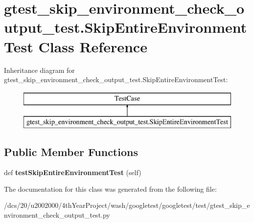 \hypertarget{classgtest__skip__environment__check__output__test_1_1SkipEntireEnvironmentTest}{}\section{gtest\+\_\+skip\+\_\+environment\+\_\+check\+\_\+output\+\_\+test.\+Skip\+Entire\+Environment\+Test Class Reference}
\label{classgtest__skip__environment__check__output__test_1_1SkipEntireEnvironmentTest}
Inheritance diagram for gtest\+\_\+skip\+\_\+environment\+\_\+check\+\_\+output\+\_\+test.\+Skip\+Entire\+Environment\+Test\+:\begin{figure}[H]
\begin{center}
\leavevmode
\includegraphics[height=2.000000cm]{classgtest__skip__environment__check__output__test_1_1SkipEntireEnvironmentTest}
\end{center}
\end{figure}
\subsection*{Public Member Functions}
\begin{DoxyCompactItemize}
\item 
\mbox{\label{classgtest__skip__environment__check__output__test_1_1SkipEntireEnvironmentTest_a9268ce42dc9a4382dc7da903b79061ce}} 
def {\bfseries test\+Skip\+Entire\+Environment\+Test} (self)
\end{DoxyCompactItemize}


The documentation for this class was generated from the following file\+:\begin{DoxyCompactItemize}
\item 
/dcs/20/u2002000/4th\+Year\+Project/wash/googletest/googletest/test/gtest\+\_\+skip\+\_\+environment\+\_\+check\+\_\+output\+\_\+test.\+py\end{DoxyCompactItemize}
